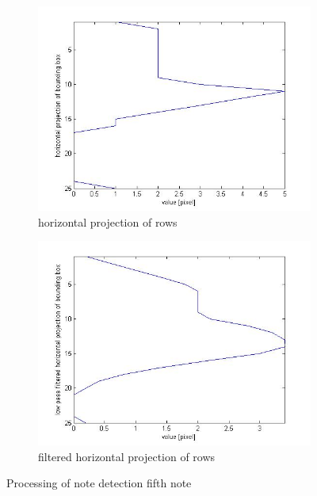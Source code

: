 \begin{figure}
\begin{subfigure}[c]{0.1\textwidth}
  \end{subfigure}
  \begin{subfigure}[c]{0.4\textwidth}
        \includegraphics[width=\textwidth]{5e.jpg}
        \caption{horizontal projection of rows}
  \end{subfigure}
  \begin{subfigure}[c]{0.4\textwidth}
        \includegraphics[width=\textwidth]{5f.jpg}
        \caption{filtered horizontal projection of rows}
  \end{subfigure}
	\caption{Processing of note detection fifth note}
	\label{fig:noteValues5}
\end{figure}


